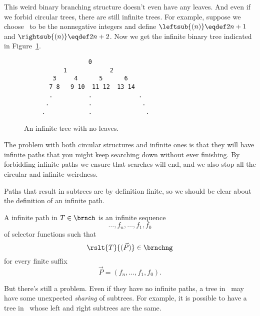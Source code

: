 \begin{definition}
This weird binary branching structure doesn't even have any leaves.
\fi
And even if we forbid circular trees, there are still infinite
trees.  For example, suppose we choose \brnch\ to be the nonnegative
integers and define $\leftsub{(n)} \eqdef 2n+1$ and $\rightsub{(n)} \eqdef
2n+2$.  Now we get the infinite binary tree indicated in
Figure~\ref{inftree123}.


\begin{figure}


\begin{verbatim}
                  0
           1            2
        3     4      5      6
       7 8   9 10  11 12  13 14
       .          .             . 
      .           .              .
     .            .               . 

\end{verbatim}

\caption{An infinite tree with no leaves.}

\label{inftree123}

\end{figure}

The problem with both circular structures and infinite ones is that
they will have infinite paths that you might keep searching down
without ever finishing.  By forbidding infinite paths we ensure that
searches will end, and we also stop all the circular and infinite
weirdness.

Paths that result in subtrees are by definition finite, so we should
be clear about the definition of an infinite path.

\begin{definition}
A infinite path in $T \in \brnch$ is an infinite sequence
\[
\dots,f_n,\dots,f_1,f_0
\]
of selector functions such that
\[
\rslt{T}{(\vec{P})} \in \brnchng
\]
for every finite suffix
\[
\vec{P} = (f_n,\dots, f_1,f_0).
\]
\end{definition}

But there's still a problem.  Even if they
have no infinite paths, a tree in \brnch\ may have some unexpected
\emph{sharing} of subtrees.  For example, it is possible to have a
tree in \brnch\ whose left and right subtrees are the same.




\end{definition}
